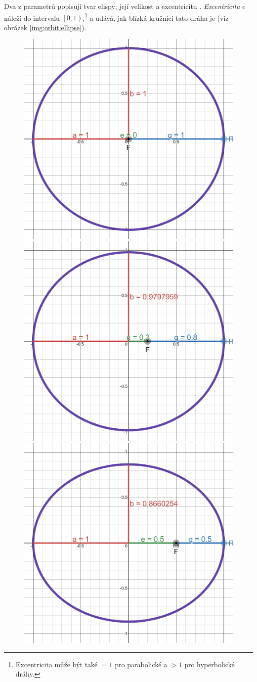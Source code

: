 \medskip

Dva z parametrů popisují tvar elispy; její velikost a excentricitu \cite{astro}. \textit{Excentricita} $e$ náleží do intervalu $\left[0,1\right)$,\footnote{Excentricita může být také $=1$ pro parabolické a $>1$ pro hyperbolické dráhy. } a udává, jak blízká kružnici tato dráha je (viz obrázek \ref{img:orbit:ellipse}).

\begin{figure}[ht]
    \centering
    \includegraphics[width=0.5\linewidth]{img/ellipse-e00.png}\hfill
    \includegraphics[width=0.5\linewidth]{img/ellipse-e02.png}\vfill
    \includegraphics[width=0.5\linewidth]{img/ellipse-e05.png}\hfill

\end{figure}
